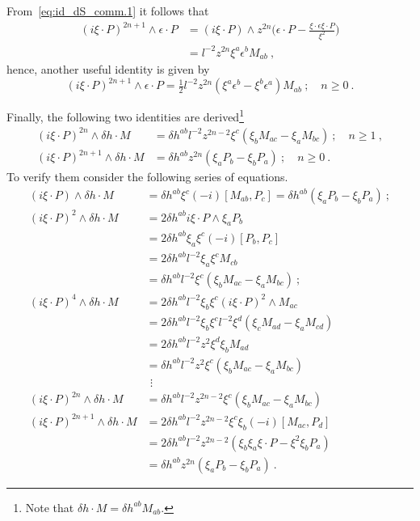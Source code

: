 \documentclass[11pt]{article}
\begin{document}
From~\eqref{eq:id_dS_comm.1} it follows that
%
\begin{displaymath}
\begin{split}
	(i\xi\cdot P)^{2n+1} \wedge \epsilon\cdot P
	&= (i\xi\cdot P) \wedge z^{2n} \bigg(\epsilon\cdot P - 
	\frac{\xi\cdot\epsilon \xi\cdot P}{\xi^2} \bigg) \\
	&= l^{-2}z^{2n} \xi^a \epsilon^b M_{ab}~,
\end{split}
\end{displaymath}
hence, another useful identity is given by
%
\begin{equation}\label{eq:id_dS_comm.2}
	(i\xi\cdot P)^{2n+1} \wedge \epsilon\cdot P = 
	\tfrac{1}{2}l^{-2}z^{2n} (\xi^a\epsilon^b - \xi^b\epsilon^a) 
	M_{ab}~;\quad n \geqslant 0~.
\end{equation}

Finally, the following two identities are derived\footnote{Note 
	that $\delta h \cdot M = \delta h^{ab} M_{ab}$.}
%
\begin{align}
	\label{eq:id_dS_comm.3}
	(i\xi\cdot P)^{2n} \wedge \delta h \cdot M &= \delta h^{ab} 
	l^{-2}z^{2n-2} \xi^c(\xi_b M_{ac} - \xi_a M_{bc})~;\quad n 
	\geqslant 1~, \\
	\label{eq:id_dS_comm.4}
	(i\xi\cdot P)^{2n+1} \wedge \delta h \cdot M &= \delta h^{ab} 
	z^{2n} (\xi_a P_b - \xi_b P_a)~;\quad n \geqslant 0~.
\end{align}
To verify them consider the following series of equations.
%
\begin{align*}
	(i\xi\cdot P)\wedge \delta h \cdot M
	&= \delta h^{ab} \xi^c (-i)[M_{ab},P_c] = \delta h^{ab} (\xi_a 
	P_b - \xi_b P_a)~; \\
	(i\xi\cdot P)^2\wedge \delta h \cdot M
	&= 2 \delta h^{ab} i\xi\cdot P \wedge \xi_a P_b \\
	&= 2 \delta h^{ab} \xi_a \xi^c (-i) [P_b,P_c] \\
	&= 2 \delta h^{ab} l^{-2} \xi_a \xi^c M_{cb} \\
	&= \delta h^{ab} l^{-2} \xi^c (\xi_b M_{ac} - \xi_a M_{bc})~; 
	\\
	(i\xi\cdot P)^4 \wedge \delta h \cdot M
	&= 2\delta h^{ab} l^{-2} \xi_b \xi^c (i\xi\cdot P)^2 \wedge 
	M_{ac} \\
	&= 2\delta h^{ab} l^{-2} \xi_b \xi^c l^{-2} \xi^d (\xi_c 
	M_{ad} - \xi_a M_{cd}) \\
	&= 2 \delta h^{ab} l^{-2} z^2 \xi^d \xi_b M_{ad} \\
	&= \delta h^{ab} l^{-2} z^2 \xi^c (\xi_b M_{ac} - \xi_a 
	M_{bc}) \\
	&~\,\vdots
	\\
	(i\xi\cdot P)^{2n} \wedge \delta h \cdot M
	&= \delta h^{ab} l^{-2} z^{2n-2} \xi^c (\xi_b M_{ac} - \xi_a 
	M_{bc}) \\
	(i\xi\cdot P)^{2n+1} \wedge \delta h \cdot M
	&= 2\delta h^{ab} l^{-2} z^{2n-2} \xi^c \xi_b (-i) 
	[M_{ac},P_d] \\
	&= 2\delta h^{ab} l^{-2} z^{2n-2} (\xi_b\xi_a \xi\cdot P - 
	\xi^2 \xi_b P_a) \\
	&= \delta h^{ab} z^{2n} (\xi_a P_b - \xi_b P_a)~.
\end{align*}


\newpage


%
\end{document}
